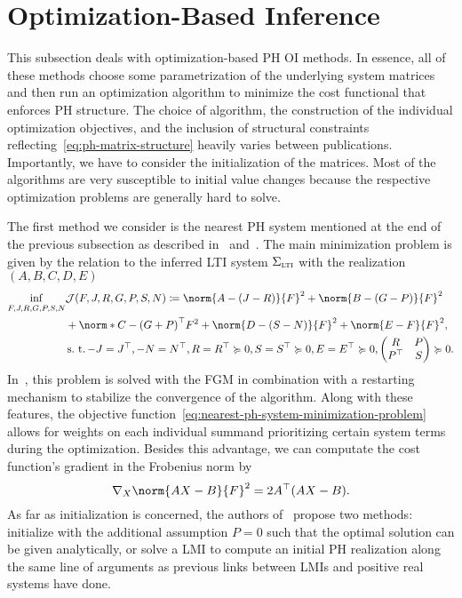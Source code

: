 \section{Optimization-Based Inference}\label{sec:optimization-based-inference}

This subsection deals with optimization-based \ac{PH} \ac{OI} methods.
In essence, all of these methods choose some parametrization of the underlying system matrices and then run an optimization algorithm to minimize the cost functional that enforces \ac{PH} structure.
The choice of algorithm, the construction of the individual optimization objectives, and the inclusion of structural constraints reflecting~\eqref{eq:ph-matrix-structure} heavily varies between publications.
Importantly, we have to consider the initialization of the matrices.
Most of the algorithms are very susceptible to initial value changes because the respective optimization problems are generally hard to solve.

The first method we consider is the nearest \ac{PH} system mentioned at the end of the previous subsection as described in~\cite{Gillis2018} and~\cite{Cherifi2019}.
The main minimization problem is given by the relation to the inferred \ac{LTI} system $\Sigma_{\textnormal{\scshape lti}}$ with the realization $(A, B, C, D, E)$
\begin{equation}\label{eq:nearest-ph-system-minimization-problem}
    \begin{alignedat}{4}
        \eqinf\limits_{F, J, R, G, P, S, N} &\mcl{J}(F, J, R, G, P, S, N) \coloneqq \norm{A - (J - R)}{F}^2 + \norm{B - (G - P)}{F}^2 \\
        &+ \norm*{C - {(G + P)}\trans}{F}^2 + \norm{D - (S - N)}{F}^2 + \norm{E - F}{F}^2, \\
        &\suchthat -J = J\trans, -N = N\trans, R = R\trans \succcurlyeq 0, S = S\trans \succcurlyeq 0, E = E\trans \succcurlyeq 0, \begin{pmatrix}
            R & P \\
            P\trans & S
        \end{pmatrix} \succcurlyeq 0.
    \end{alignedat}
\end{equation}
In~\cite{Gillis2018}, this problem is solved with the \ac{FGM} in combination with a restarting mechanism to stabilize the convergence of the algorithm.
Along with these features, the objective function~\eqref{eq:nearest-ph-system-minimization-problem} allows for weights on each individual summand prioritizing certain system terms during the optimization.
Besides this advantage, we can computate the cost function's gradient in the Frobenius norm by
\begin{equation*}
    \nabla_X \norm{A X - B}{F}^2 = 2 A\trans (A X - B).
\end{equation*}
As far as initialization is concerned, the authors of~\cite{Gillis2018} propose two methods: initialize with the additional assumption $P = 0$ such that the optimal solution can be given analytically, or solve a \ac{LMI} to compute an initial \ac{PH} realization along the same line of arguments as previous links between \acp{LMI} and positive real systems have done.

